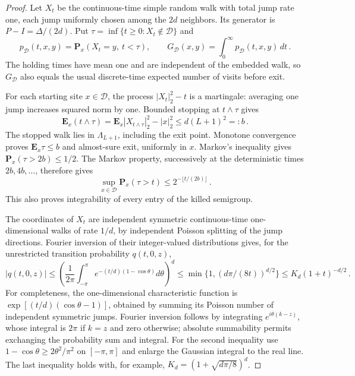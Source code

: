 \documentclass[12pt]{amsart}
\begin{document}
\begin{proof}
Let $X_t$ be the continuous-time simple random walk with total jump rate one, each jump uniformly chosen among the $2d$ neighbors. Its generator is $P-I=\Delta/(2d)$. Put $\tau=\inf\{t\geq0:X_t\notin\mathcal D\}$ and
\begin{equation*}
 p_{\mathcal D}(t,x,y)=\mathbf P_x(X_t=y,\ t<\tau),\qquad
 G_{\mathcal D}(x,y)=\int_0^\infty p_{\mathcal D}(t,x,y)\,dt\,.
\end{equation*}
The holding times have mean one and are independent of the embedded walk, so $G_{\mathcal D}$ also equals the usual discrete-time expected number of visits before exit.

For each starting site $x\in\mathcal D$, the process $|X_t|_2^2-t$ is a martingale: averaging one jump increases squared norm by one. Bounded stopping at $t\wedge\tau$ gives
\begin{equation*}
 \mathbf E_x(t\wedge\tau)
 =\mathbf E_x|X_{t\wedge\tau}|_2^2-|x|_2^2
 \leq d(L+1)^2=:b\,.
\end{equation*}
The stopped walk lies in $\Lambda_{L+1}$, including the exit point. Monotone convergence proves $\mathbf E_x\tau\leq b$ and almost-sure exit, uniformly in $x$. Markov's inequality gives $\mathbf P_x(\tau>2b)\leq1/2$. The Markov property, successively at the deterministic times $2b,4b,\ldots$, therefore gives
\begin{equation*}
 \sup_{x\in\mathcal D}\mathbf P_x(\tau>t)\leq2^{-\lfloor t/(2b)\rfloor}\,.
\end{equation*}
This also proves integrability of every entry of the killed semigroup.

The coordinates of $X_t$ are independent symmetric continuous-time one-dimensional walks of rate $1/d$, by independent Poisson splitting of the jump directions. Fourier inversion of their integer-valued distributions gives, for the unrestricted transition probability $q(t,0,z)$,
\begin{equation*}
 |q(t,0,z)|\leq
 \left(\frac1{2\pi}\int_{-\pi}^{\pi}
 e^{-(t/d)(1-\cos\theta)}d\theta\right)^d
 \leq\min\{1,(d\pi/(8t))^{d/2}\}
 \leq K_d(1+t)^{-d/2}\,.
\end{equation*}
For completeness, the one-dimensional characteristic function is $\exp[(t/d)(\cos\theta-1)]$, obtained by summing its Poisson number of independent symmetric jumps. Fourier inversion follows by integrating $e^{i\theta(k-z)}$, whose integral is $2\pi$ if $k=z$ and zero otherwise; absolute summability permits exchanging the probability sum and integral. For the second inequality use $1-\cos\theta\geq2\theta^2/\pi^2$ on $[-\pi,\pi]$ and enlarge the Gaussian integral to the real line. The last inequality holds with, for example, $K_d=(1+\sqrt{d\pi/8})^d$.


\end{proof}
\end{document}
